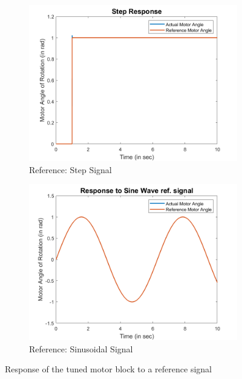\documentclass[a4paper,12pt]{report}
\begin{document}
\begin{figure}[H]
	\begin{subfigure}{.5\textwidth}
		\centering
		\includegraphics[width=\linewidth]{images/step-response.png}  
		\caption{Reference: Step Signal}
		\label{step-response}
	\end{subfigure}
	\begin{subfigure}{.5\textwidth}
		\centering
		\includegraphics[width=\linewidth]{images/sin-response.png}  
		\caption{Reference: Sinusoidal Signal}
		\label{sin-repsonse}
	\end{subfigure}
	\caption{Response of the tuned motor block to a reference signal}
	\label{response-motor}
\end{figure}
\end{document}
